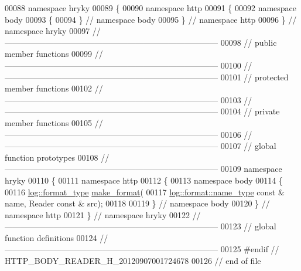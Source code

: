 \begin{DoxyCode}
00088 \textcolor{keyword}{namespace }hryky
00089 \{
00090 \textcolor{keyword}{namespace }http
00091 \{
00092 \textcolor{keyword}{namespace }body
00093 \{
00094 \} \textcolor{comment}{// namespace body}
00095 \} \textcolor{comment}{// namespace http}
00096 \} \textcolor{comment}{// namespace hryky}
00097 \textcolor{comment}{//
      ------------------------------------------------------------------------------}
00098 \textcolor{comment}{// public member functions}
00099 \textcolor{comment}{//
      ------------------------------------------------------------------------------}
00100 \textcolor{comment}{//
      ------------------------------------------------------------------------------}
00101 \textcolor{comment}{// protected member functions}
00102 \textcolor{comment}{//
      ------------------------------------------------------------------------------}
00103 \textcolor{comment}{//
      ------------------------------------------------------------------------------}
00104 \textcolor{comment}{// private member functions}
00105 \textcolor{comment}{//
      ------------------------------------------------------------------------------}
00106 \textcolor{comment}{//
      ------------------------------------------------------------------------------}
00107 \textcolor{comment}{// global function prototypes}
00108 \textcolor{comment}{//
      ------------------------------------------------------------------------------}
00109 \textcolor{keyword}{namespace }hryky
00110 \{
00111 \textcolor{keyword}{namespace }http
00112 \{
00113 \textcolor{keyword}{namespace }body
00114 \{
00116     \hyperlink{namespacehryky_1_1log_ad50448c3f934f1eacd5c1bcffe8111e1}{log::format_type} \hyperlink{namespacehryky_afd615217f648ff164bc40fb82166d959}{make_format}(
00117         \hyperlink{namespacehryky_1_1log_1_1format_ab7408d1e2ed2d648dbf9bba69eb74288}{log::format::name_type} \textcolor{keyword}{const} & name, Reader \textcolor{keyword}{const} & src);
00118 
00119 \} \textcolor{comment}{// namespace body}
00120 \} \textcolor{comment}{// namespace http}
00121 \} \textcolor{comment}{// namespace hryky}
00122 \textcolor{comment}{//
      ------------------------------------------------------------------------------}
00123 \textcolor{comment}{// global function definitions}
00124 \textcolor{comment}{//
      ------------------------------------------------------------------------------}
00125 \textcolor{preprocessor}{#endif // HTTP\_BODY\_READER\_H\_20120907001724678}
00126 \textcolor{preprocessor}{}\textcolor{comment}{// end of file}
\end{DoxyCode}
